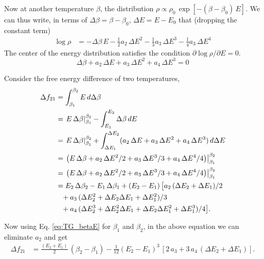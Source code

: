 \documentclass[aip,jcp,preprint,notitlepage, superscriptaddress]{revtex4-1}
\begin{document}
Now at another temperature $\beta$,
the distribution
$\rho \propto \rho_0 \, \exp[-(\beta - \beta_0) \, E]$.
%
We can thus write,
in terms of $\Delta \beta = \beta - \beta_0$,
$\Delta E = E - E_0$ that (dropping the constant term)
%
\begin{align*}
\log \rho
&=
-\Delta \beta \, E
-\frac{1}{2} a_2 \, \Delta E^2
-\frac{1}{3} a_3 \, \Delta E^3
-\frac{1}{4} a_3 \, \Delta E^4
\end{align*}
%
The center of the energy distribution
satisfies the condition
$\partial \log \rho/\partial E = 0$.
%
\begin{equation}
  \Delta \beta
+a_2 \, \Delta E
+a_3 \, \Delta E^2
+a_4 \, \Delta E^3
= 0
\label{eq:TG_betaE}
\end{equation}



Consider the free energy difference of two temperatures,
%
\begin{align}
\Delta f_{21}
&=
\int_{ \beta_1 }^{ \beta_2 } E \, d \Delta \beta
\notag \\
&=
\left.
  E \, \Delta \beta
\right|_{\beta_1}^{\beta_2}
-
\int_{E_1}^{E_2}
  \Delta \beta \, dE
\notag \\
&=
\left.
  E \, \Delta \beta
\right|_{\beta_1}^{\beta_2}
+
\int_{\Delta E_1}^{\Delta E_2}
  (a_2 \, \Delta E + a_3 \, \Delta E^2 + a_4 \, \Delta E^3) \, d\Delta E
\notag \\
&=
\left.
\left(
  E \, \Delta \beta
  +
  a_2 \, \Delta E^2/2 + a_3 \, \Delta E^3/3 + a_4 \, \Delta E^4/4
\right)
\right|_{\beta_1}^{\beta_2}
\notag \\
&=
\left.
\left(
  E \, \Delta \beta
  + a_2 \, \Delta E^2/2 + a_3 \, \Delta E^3/3 + a_4 \, \Delta E^4/4
\right)
\right|_{\beta_1}^{\beta_2}
\notag \\
&=
E_2 \, \Delta \beta_2 - E_1 \, \Delta \beta_1
+
(E_2 - E_1) \,
\big[
  a_2 \, ( \Delta E_2 + \Delta E_1) / 2
\notag\\
&\phantom{=}
  + a_3 \, ( \Delta E_2^2 + \Delta E_2 \Delta E_1 + \Delta E_1^2 )/3
\notag \\
&\phantom{=}
  + a_4 \, ( \Delta E_2^3 + \Delta E_2^2 \Delta E_1 + \Delta E_2 \Delta E_1^2 + \Delta E_1^3 ) / 4
\big].
\label{eq:TG_dfstep1}
\end{align}



Now using Eq. \eqref{eq:TG_betaE} for $\beta_1$ and $\beta_2$,
in the above equation we can eliminate $a_2$ and get
%
\begin{align*}
\Delta f_{21}
&=
\frac { (E_2 + E_1) }{ 2 } \, (\beta_2 - \beta_1)
-
\frac{ 1 } { 12 }
(E_2 - E_1)^3 \,
\left[
  2 \, a_3
  +3 \, a_4 \, ( \Delta E_2 + \Delta E_1 )
\right].
\end{align*}
\end{document}
